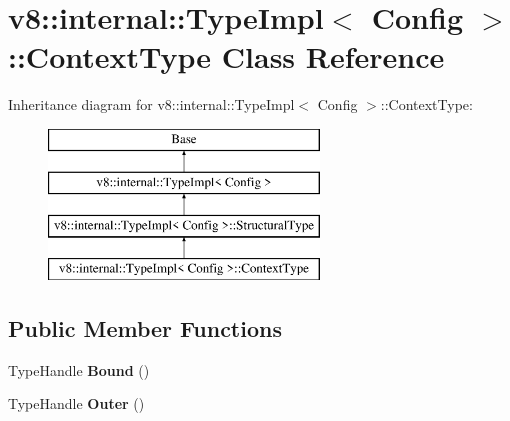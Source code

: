 \hypertarget{classv8_1_1internal_1_1_type_impl_1_1_context_type}{}\section{v8\+:\+:internal\+:\+:Type\+Impl$<$ Config $>$\+:\+:Context\+Type Class Reference}
\label{classv8_1_1internal_1_1_type_impl_1_1_context_type}
Inheritance diagram for v8\+:\+:internal\+:\+:Type\+Impl$<$ Config $>$\+:\+:Context\+Type\+:\begin{figure}[H]
\begin{center}
\leavevmode
\includegraphics[height=4.000000cm]{classv8_1_1internal_1_1_type_impl_1_1_context_type}
\end{center}
\end{figure}
\subsection*{Public Member Functions}
\begin{DoxyCompactItemize}
\item 
\hypertarget{classv8_1_1internal_1_1_type_impl_1_1_context_type_a7b8d581a812b366231db85f61625f240}{}Type\+Handle {\bfseries Bound} ()\label{classv8_1_1internal_1_1_type_impl_1_1_context_type_a7b8d581a812b366231db85f61625f240}

\item 
\hypertarget{classv8_1_1internal_1_1_type_impl_1_1_context_type_ac291495f47d47d4ff17175b723a962a1}{}Type\+Handle {\bfseries Outer} ()\label{classv8_1_1internal_1_1_type_impl_1_1_context_type_ac291495f47d47d4ff17175b723a962a1}

\end{DoxyCompactItemize}
